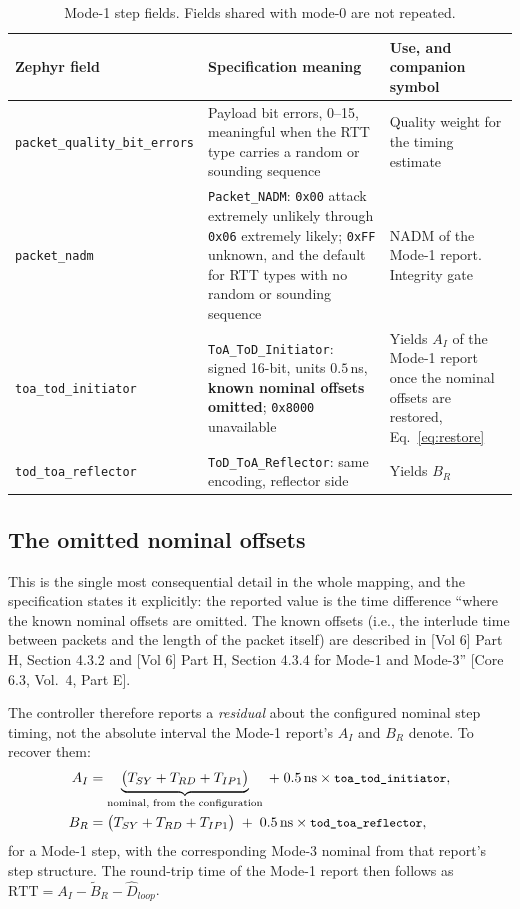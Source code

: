 \documentclass[11pt,a4paper]{article}
\newcommand{\code}[1]{\texttt{\small #1}}
\newcommand{\NADM}{\ensuremath{\mathrm{NADM}}}
\newcommand{\RTT}{\ensuremath{\mathrm{RTT}}}
\newcommand{\core}[1]{\textcolor{rulegrey}{\small[Core 6.3, #1]}}
\newcommand{\Tsy}{\ensuremath{T_{SY}}}
\newcommand{\Trd}{\ensuremath{T_{RD}}}
\begin{document}
\begin{table}[htb]
\caption{Mode-1 step fields. Fields shared with mode-0 are not repeated.}
\label{tab:mode1}
\centering\scriptsize
\begin{tabular}{@{}L{32mm}L{56mm}L{50mm}@{}}
\toprule
Zephyr field & Specification meaning & Use, and companion symbol \\
\midrule
\code{packet\_\allowbreak{}quality\_\allowbreak{}bit\_\allowbreak{}errors} & Payload bit errors, 0--15, meaningful when the RTT type carries a random or sounding sequence & Quality weight for the timing estimate \\
\code{packet\_\allowbreak{}nadm} & \code{Packet\_\allowbreak{}NADM}: \code{0x00} attack extremely unlikely through \code{0x06} extremely likely; \code{0xFF} unknown, and the default for RTT types with no random or sounding sequence & $\NADM$ of the Mode-1 report. Integrity gate \\
\code{toa\_\allowbreak{}tod\_\allowbreak{}initiator} & \code{ToA\_\allowbreak{}ToD\_\allowbreak{}Initiator}: signed 16-bit, units $0.5$\,ns, \textbf{known nominal offsets omitted}; \code{0x8000} unavailable & Yields $A_I$ of the Mode-1 report once the nominal offsets are restored, Eq.~\eqref{eq:restore} \\
\code{tod\_\allowbreak{}toa\_\allowbreak{}reflector} & \code{ToD\_\allowbreak{}ToA\_\allowbreak{}Reflector}: same encoding, reflector side & Yields $B_R$ \\
\bottomrule
\end{tabular}
\end{table}

\subsection{The omitted nominal offsets}

This is the single most consequential detail in the whole mapping, and the specification states it
explicitly: the reported value is the time difference ``where the known nominal offsets are omitted.
The known offsets (i.e., the interlude time between packets and the length of the packet itself) are
described in [Vol 6] Part H, Section 4.3.2 and [Vol 6] Part H, Section 4.3.4 for Mode-1 and Mode-3''
\core{Vol.\ 4, Part E}.

The controller therefore reports a \emph{residual} about the configured nominal step timing, not the
absolute interval the Mode-1 report's $A_I$ and $B_R$ denote. To recover them:
\begin{align}
A_I &= \underbrace{\bigl(\Tsy + \Trd + T_{IP1}\bigr)}_{\text{nominal, from the configuration}}
       \;+\; 0.5\,\text{ns}\times\text{\code{toa\_\allowbreak{}tod\_\allowbreak{}initiator}} , \label{eq:restore}\\
B_R &= \bigl(\Tsy + \Trd + T_{IP1}\bigr)
       \;+\; 0.5\,\text{ns}\times\text{\code{tod\_\allowbreak{}toa\_\allowbreak{}reflector}} ,
\end{align}
for a Mode-1 step, with the corresponding Mode-3 nominal from that report's step structure. The
round-trip time of the Mode-1 report then follows as $\RTT = A_I - \tilde B_R - \hat D_{loop}$.
\end{document}
